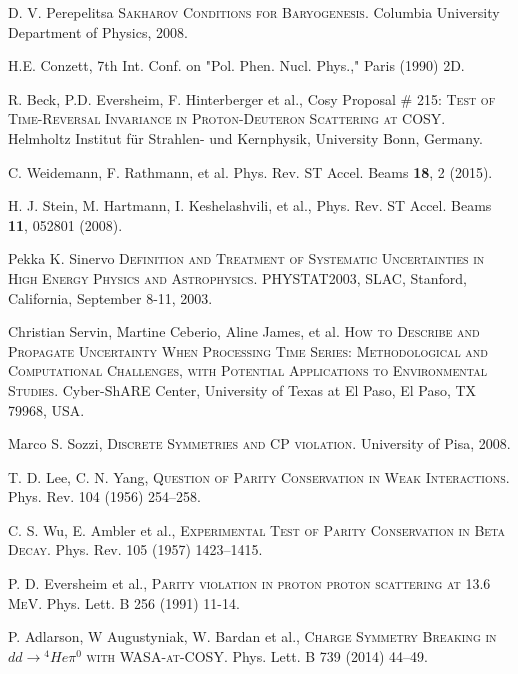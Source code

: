 \documentclass{article}
\begin{document}
	\pagebreak
	\begin{thebibliography}{99}
		
		D. V. Perepelitsa
		\textsc{Sakharov Conditions for Baryogenesis}.
		Columbia University Department of Physics,
		2008.
		
		H.E. Conzett,
		7th Int. Conf. on "Pol. Phen. Nucl. Phys.," Paris (1990) 2D.
		
		R. Beck, P.D. Eversheim, F. Hinterberger et al.,
		Cosy Proposal \# 215:
		\textsc{Test of Time-Reversal Invariance in Proton-Deuteron Scattering at 
			COSY}.
		Helmholtz Institut für Strahlen- und Kernphysik, University Bonn, Germany.
		
		C. Weidemann, F. Rathmann, et al. Phys. Rev. ST Accel. Beams \textbf{18}, 2 (2015).
		
		H. J. Stein, M. Hartmann, I. Keshelashvili, et al., Phys. Rev. ST Accel. Beams \textbf{11}, 052801 (2008).
		
		Pekka K. Sinervo
		\textsc{Definition and Treatment of Systematic Uncertainties in High Energy Physics and Astrophysics}.
		PHYSTAT2003, SLAC, Stanford, California, 
		September 8-11, 2003.
		
		Christian Servin, Martine Ceberio, Aline James, et al.
		\textsc{How to Describe and Propagate Uncertainty When Processing Time Series: Methodological and Computational Challenges, with Potential Applications to Environmental Studies}.
		Cyber-ShARE Center, University of Texas at El Paso, El Paso, TX 79968, USA. 
		
		Marco S. Sozzi,
		\textsc{Discrete Symmetries and CP violation}.
		University of Pisa,
		2008.
		
		T. D. Lee, C. N. Yang,
		\textsc{Question of Parity Conservation in Weak Interactions}.
		Phys. Rev. 104 (1956) 254--258.
		
		C. S. Wu, E. Ambler et al.,
		\textsc{Experimental Test of Parity Conservation in Beta Decay}.
		Phys. Rev. 105 (1957) 1423--1415.
		
		P. D. Eversheim et al.,
		\textsc{Parity violation in proton proton scattering at 13.6 MeV}.
		Phys. Lett. B 256 (1991) 11-14.
		
		P. Adlarson, W Augustyniak, W. Bardan et al.,
		\textsc{Charge Symmetry Breaking in $dd \to {}^4He \pi^0$ with WASA-at-COSY}.
		Phys. Lett. B 739 (2014) 44–49.
		

\end{thebibliography}
\end{document}
